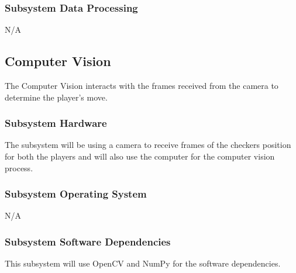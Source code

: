 \subsubsection{Subsystem Data Processing}
N/A

\subsection{Computer Vision}
The Computer Vision interacts with the frames received from the camera to determine the player's move.


\subsubsection{Subsystem Hardware}
The subsystem will be using a camera to receive frames of the checkers position for both the players and will also use the computer for the computer vision process.

\subsubsection{Subsystem Operating System}
N/A

\subsubsection{Subsystem Software Dependencies}
This subsystem will use OpenCV and NumPy for the software dependencies.

